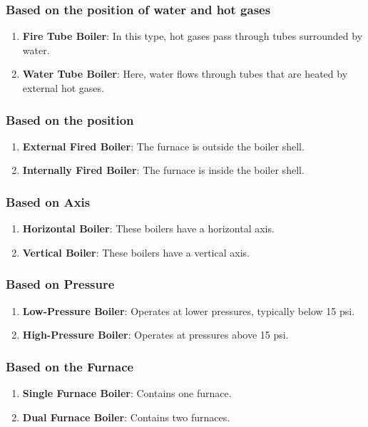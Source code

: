 \subsubsection{Based on the position of water and hot gases}
\begin{enumerate}
    \item \textbf{Fire Tube Boiler}: In this type, hot gases pass through tubes surrounded by water.
    \item \textbf{Water Tube Boiler}: Here, water flows through tubes that are heated by external hot gases.
\end{enumerate}

\subsubsection{Based on the position}
\begin{enumerate}
    \item \textbf{External Fired Boiler}: The furnace is outside the boiler shell.
    \item \textbf{Internally Fired Boiler}: The furnace is inside the boiler shell.
\end{enumerate}

\subsubsection{Based on Axis}
\begin{enumerate}
    \item \textbf{Horizontal Boiler}: These boilers have a horizontal axis.
    \item \textbf{Vertical Boiler}: These boilers have a vertical axis.
\end{enumerate}

\subsubsection{Based on Pressure}
\begin{enumerate}
    \item \textbf{Low-Pressure Boiler}: Operates at lower pressures, typically below 15 psi.
    \item \textbf{High-Pressure Boiler}: Operates at pressures above 15 psi.
\end{enumerate}

\subsubsection{Based on the Furnace}
\begin{enumerate}
    \item \textbf{Single Furnace Boiler}: Contains one furnace.
    \item \textbf{Dual Furnace Boiler}: Contains two furnaces.
\end{enumerate}

